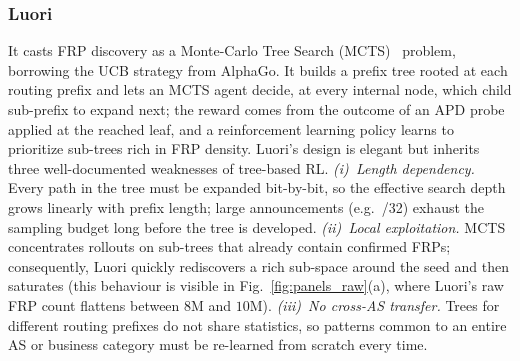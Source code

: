 \documentclass[conference]{IEEEtran}
\begin{document}
\subsubsection{Luori~\cite{cheng2024luori}}
\label{sec:bg:luori}
It casts FRP discovery as a Monte-Carlo Tree Search
(MCTS)~\cite{silver2016mcts} problem, borrowing the UCB strategy
from AlphaGo.  It builds a prefix tree rooted at each routing
prefix and lets an MCTS agent decide, at every internal node,
which child sub-prefix to expand next; the reward comes from
the outcome of an APD probe applied at the reached leaf, and a
reinforcement learning policy learns to prioritize sub-trees
rich in FRP density.  Luori's design is elegant but inherits
three well-documented weaknesses of tree-based RL.
\emph{(i)~Length dependency.}  Every path in the tree must be
expanded bit-by-bit, so the effective search depth grows
linearly with prefix length; large announcements (e.g.\ /32)
exhaust the sampling budget long before the tree is developed.
\emph{(ii)~Local exploitation.}  MCTS concentrates rollouts on
sub-trees that already contain confirmed FRPs; consequently,
Luori quickly rediscovers a rich sub-space around the seed and
then saturates (this behaviour is visible in
Fig.~\ref{fig:panels_raw}(a), where Luori's raw FRP count
flattens between $8$M and $10$M).
\emph{(iii)~No cross-AS transfer.}  Trees for different routing
prefixes do not share statistics, so patterns common to an
entire AS or business category must be re-learned from scratch
every time.
\end{document}
